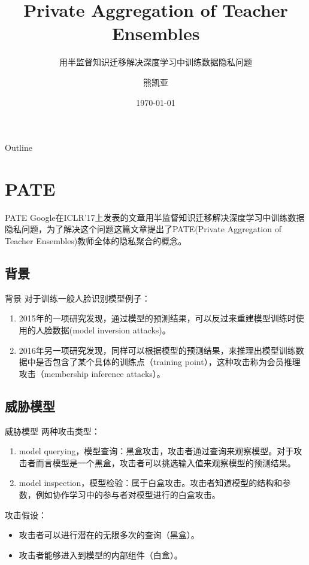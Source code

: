 \documentclass[aspectratio=169]{beamer}
\title{Private Aggregation of Teacher Ensembles}
\subtitle{用半监督知识迁移解决深度学习中训练数据隐私问题}
\author{熊凯亚}
\date{\today}
\institute[JNU]{Jinan University}
\begin{document}
\begin{frame}
\titlepage
\end{frame}

\begin{frame}{Outline}
\tableofcontents[
    currentsection,
    sectionstyle=show,
    subsectionstyle=show
  ]
\end{frame}

\section{PATE}
\begin{frame}{PATE}
Google在ICLR'17上发表的文章\cite{Papernot2016SemisupervisedKT}用半监督知识迁移解决深度学习中训练数据隐私问题，为了解决这个问题这篇文章提出了PATE(Private Aggregation of Teacher Ensembles)教师全体的隐私聚合的概念。
\end{frame}

\subsection{背景}
\begin{frame}{背景}
对于训练一般人脸识别模型例子：
\begin{enumerate}
\item 2015年的一项研究发现，通过模型的预测结果，可以反过来重建模型训练时使用的人脸数据(model inversion attacks)。
\item 2016年另一项研究发现，同样可以根据模型的预测结果，来推理出模型训练数据中是否包含了某个具体的训练点（training point），这种攻击称为会员推理攻击（membership inference attacks）。
\end{enumerate}
\end{frame}

\subsection{威胁模型}
\begin{frame}{威胁模型}
两种攻击类型：
\begin{enumerate}
\item model querying，模型查询：黑盒攻击，攻击者通过查询来观察模型。对于攻击者而言模型是一个黑盒，攻击者可以挑选输入值来观察模型的预测结果。
\item model inspection，模型检验：属于白盒攻击。攻击者知道模型的结构和参数，例如\cite{hitaj2017deep}协作学习中的参与者对模型进行的白盒攻击。
\end{enumerate}
攻击假设：
\begin{itemize}
\item 攻击者可以进行潜在的无限多次的查询（黑盒）。
\item 攻击者能够进入到模型的内部组件（白盒）。
\end{itemize}
\end{frame}
\end{document}
